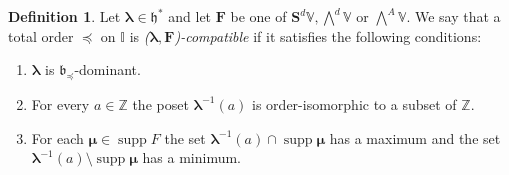\documentclass[11pt,fleqn]{amsart}
\newcommand\ZZ{\mathbb Z}
\newcommand\II{\mathbb I}
\theoremstyle{definition}
\newtheorem{defn}[thm]{Definition}
\theoremstyle{remark}
\theoremstyle{remark}
\newcommand\VV{\mathbb V}
\renewcommand\SS{\mathbf S}
\newcommand\lie[1]{\mathfrak{#1}}
\newcommand\wt[1]{\boldsymbol{#1}}
\DeclareMathOperator\supp{supp}
\begin{document}
\begin{defn}
\label{defn:compatible}
Let $\wt\lambda \in \lie h^*$ and let $\mathbf F$ be one of $\SS^d\VV, 
\bigwedge^d \VV$ or $\bigwedge^A \VV$. We say that a total order $\preceq$ on 
$\II$ is \emph{($\wt\lambda, \mathbf F$)-compatible} if it satisfies the 
following 
conditions:
\begin{enumerate}
  \item $\wt \lambda$ is $\lie b_{\preceq}$-dominant.
  \item For every $a \in \ZZ$ the poset $\wt\lambda^{-1}(a)$ is order-isomorphic 
    to a subset of $\ZZ$.
  \item For each $\wt\mu \in \supp F$ the set $\wt\lambda^{-1}(a) \cap \supp 
    \wt\mu$ has a maximum and the set $\wt\lambda^{-1}(a) \setminus \supp \wt\mu$ 
    has a minimum.
\end{enumerate}
\end{defn}
\end{document}
